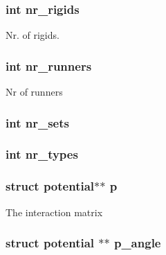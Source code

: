 \hypertarget{structengine_a9322f4e10554dfb5722aaab9d8b265e9}{
\subsubsection[{nr\-\_\-rigids}]{\setlength{\rightskip}{0pt plus 5cm}int nr\-\_\-rigids}}\label{structengine_a9322f4e10554dfb5722aaab9d8b265e9}
Nr. of rigids. \hypertarget{structengine_a37e9992e3ad384431b607bcd606b3d9f}{
\subsubsection[{nr\-\_\-runners}]{\setlength{\rightskip}{0pt plus 5cm}int nr\-\_\-runners}}\label{structengine_a37e9992e3ad384431b607bcd606b3d9f}
Nr of runners \hypertarget{structengine_a8c0471ad6cf64a6a06fadd14ed2629e1}{
\subsubsection[{nr\-\_\-sets}]{\setlength{\rightskip}{0pt plus 5cm}int nr\-\_\-sets}}\label{structengine_a8c0471ad6cf64a6a06fadd14ed2629e1}
\hypertarget{structengine_a09fc8a1fc18fd82469354adc4e5789f7}{
\subsubsection[{nr\-\_\-types}]{\setlength{\rightskip}{0pt plus 5cm}int nr\-\_\-types}}\label{structengine_a09fc8a1fc18fd82469354adc4e5789f7}
\hypertarget{structengine_a55e3996f3d2d21de5ba97f68400758e2}{
\subsubsection[{p}]{\setlength{\rightskip}{0pt plus 5cm}struct {\bf potential}$\ast$$\ast$ p}}\label{structengine_a55e3996f3d2d21de5ba97f68400758e2}
The interaction matrix \hypertarget{structengine_a9101bf6094ebf4f3d00c7d8299dfbacb}{
\subsubsection[{p\-\_\-angle}]{\setlength{\rightskip}{0pt plus 5cm}struct {\bf potential} $\ast$$\ast$ p\-\_\-angle}}\label{structengine_a9101bf6094ebf4f3d00c7d8299dfbacb}

